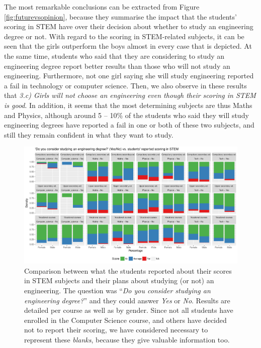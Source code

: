 \documentclass[journal,transmag]{IEEEtran}
\begin{document}
The most remarkable conclusions can be extracted from Figure \ref{fig:futurevsopinion}, because they summarise the impact that the students' scoring in STEM have over their decision about whether to study an engineering degree or not. With regard to the scoring in STEM-related subjects, it can be seen that the girls outperform the boys almost in every case that is depicted. At the same time, students who said that they are considering to study an engineering degree report better results than those who will not study an engineering. Furthermore, not one girl saying she will study engineering reported a fail in technology or computer science. Then, we also observe in these results that \textit{3.c) Girls will not choose an engineering even though their scoring in STEM is good}. In addition, it seems that the most determining subjects are thus Maths and Physics, although around 5 -- 10\% of the students who said they will study engineering degrees have reported a fail in one or both of these two subjects, and still they remain confident in what they want to study.

\begin{figure}
	\centering
	\includegraphics[width=1\textwidth]{img/future_vs_scoringSTEM.pdf}
	\caption{Comparison between what the students reported about their scores in STEM subjects and their plans about studying (or not) an engineering. The question was ``\textit{Do you consider studying an engineering degree?}'' and they could answer \textit{Yes} or \textit{No}. Results are detailed per course as well as by gender. Since not all students have enrolled in the Computer Science course, and others have decided not to report their scoring, we have considered necessary to represent these \textit{blanks}, because they give valuable information too.}
	\label{fig:futurevsscore}
\end{figure}
\end{document}
